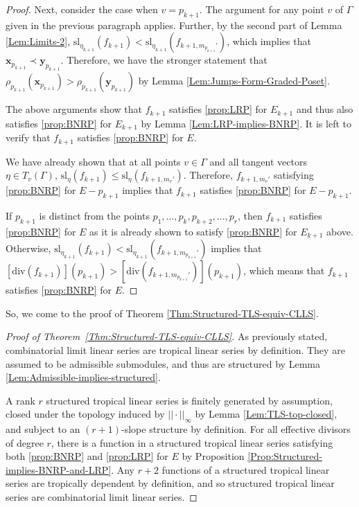 \documentclass{amsart}
\begin{document}
\begin{proof}
		Next, consider the case when $v = p_{k+1}$. The argument for any point $v$ of $\Gamma$ given in the previous paragraph applies. Further, by the second part of Lemma \ref{Lem:Limits-2}, $\mathrm{sl}_{\eta_{k+1}} (f_{k+1}) < \mathrm{sl}_{\eta_{k+1}} (f_{k+1,m_{p_{k+1}}'})$, which implies that $\mathbf{x}_{p_{k+1}} \prec \mathbf{y}_{p_{k+1}}$. Therefore, we have the stronger statement that $\rho_{p_{k+1}}(\mathbf{x}_{p_{k+1}}) > \rho_{p_{k+1}}(\mathbf{y}_{p_{k+1}})$ by Lemma \ref{Lem:Jumps-Form-Graded-Poset}.
		
		The above arguments show that $f_{k+1}$ satisfies \ref{prop:LRP} for $E_{k+1}$ and thus also satisfies \ref{prop:BNRP} for $E_{k+1}$ by Lemma \ref{Lem:LRP-implies-BNRP}. It is left to verify that $f_{k+1}$ satisfies \ref{prop:BNRP} for $E$.
		
		We have already shown that at all points $v \in \Gamma$ and all tangent vectors $\eta \in T_v(\Gamma)$, $\mathrm{sl}_{\eta}(f_{k+1}) \leq \mathrm{sl}_{\eta}(f_{k+1,m_v'})$. Therefore, $f_{k+1,m_v'}$ satisfying \ref{prop:BNRP} for $E - p_{k+1}$ implies that $f_{k+1}$ satisfies \ref{prop:BNRP} for $E - p_{k+1}$.
		
		If $p_{k+1}$ is distinct from the points $p_1, \ldots, p_{k}, p_{k+2}, \ldots, p_{r}$, then $f_{k+1}$ satisfies \ref{prop:BNRP} for $E$ as it is already shown to satisfy \ref{prop:BNRP} for $E_{k+1}$ above. Otherwise, $\mathrm{sl}_{\eta_{k+1}}(f_{k+1}) < \mathrm{sl}_{\eta_{k+1}}(f_{k+1,m_{p_{k+1}}'})$ implies that $[\mathrm{div}(f_{k+1})](p_{k+1}) > [\mathrm{div}(f_{k+1,m_{p_{k+1}}'})](p_{k+1})$, which means that $f_{k+1}$ satisfies \ref{prop:BNRP} for $E$.
	\end{proof}
	
	So, we come to the proof of Theorem \ref{Thm:Structured-TLS-equiv-CLLS}.
	
	\begin{proof}[Proof of Theorem~\ref{Thm:Structured-TLS-equiv-CLLS}]
		As previously stated, combinatorial limit linear series are tropical linear series by definition. They are assumed to be admissible submodules, and thus are structured by Lemma \ref{Lem:Admissible-implies-structured}.
		
		A rank $r$ structured tropical linear series is finitely generated by assumption, closed under the topology induced by $||\cdot||_{\infty}$ by Lemma \ref{Lem:TLS-top-closed}, and subject to an $(r+1)$-slope structure by definition. For all effective divisors of degree $r$, there is a function in a structured tropical linear series satisfying both \ref{prop:BNRP} and \ref{prop:LRP} for $E$ by Proposition \ref{Prop:Structured-implies-BNRP-and-LRP}. Any $r+2$ functions of a structured tropical linear series are tropically dependent by definition, and so structured tropical linear series are combinatorial limit linear series.
	\end{proof}
	
\end{document}
